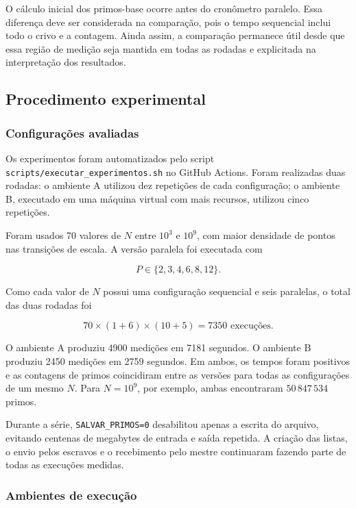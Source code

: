 \documentclass[12pt,a4paper]{article}
\begin{document}
O cálculo inicial dos primos-base ocorre antes do cronômetro paralelo. Essa
diferença deve ser considerada na comparação, pois o tempo sequencial inclui
todo o crivo e a contagem. Ainda assim, a comparação permanece útil desde que
essa região de medição seja mantida em todas as rodadas e explicitada na
interpretação dos resultados.

\subsection{Procedimento experimental}

\subsubsection{Configurações avaliadas}

Os experimentos foram automatizados pelo script
\texttt{scripts/executar\_experimentos.sh} no GitHub Actions.
Foram realizadas duas rodadas: o ambiente A utilizou dez repetições de cada
configuração; o ambiente B, executado em uma máquina virtual com mais
recursos, utilizou cinco repetições.

Foram usados 70 valores de $N$ entre $10^3$ e $10^9$, com maior densidade de
pontos nas transições de escala. A versão paralela foi executada com

\begin{equation}
    P\in\{2,3,4,6,8,12\}.
\end{equation}

Como cada valor de $N$ possui uma configuração sequencial e seis paralelas, o
total das duas rodadas foi

\begin{equation}
    70\times(1+6)\times(10+5)=7350\text{ execuções}.
\end{equation}

O ambiente A produziu 4900 medições em 7181 segundos. O ambiente B produziu
2450 medições em 2759 segundos. Em ambos, os tempos foram positivos e as
contagens de primos coincidiram entre as versões para todas as configurações
de um mesmo $N$. Para $N=10^9$, por exemplo, ambas encontraram
$50\,847\,534$ primos.

Durante a série, \texttt{SALVAR\_PRIMOS=0} desabilitou apenas a escrita do
arquivo, evitando centenas de megabytes de entrada e saída repetida. A criação
das listas, o envio pelos escravos e o recebimento pelo mestre continuaram
fazendo parte de todas as execuções medidas.

\subsubsection{Ambientes de execução}
\end{document}
